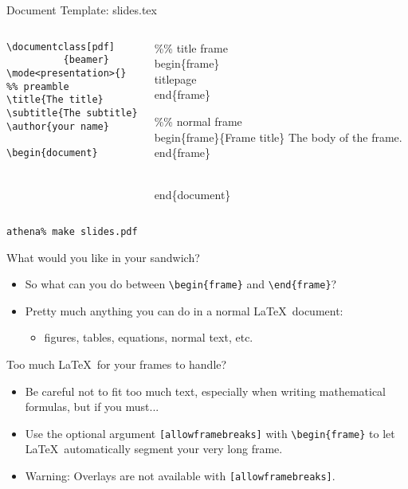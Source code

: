 \documentclass{beamer}
\begin{document}
\begin{frame}[fragile]{Document Template: slides.tex}
\begin{columns}[t]
  \begin{block}{}
    \begin{verbatim}
\documentclass[pdf]
          {beamer}
\mode<presentation>{}
%% preamble
\title{The title}
\subtitle{The subtitle}
\author{your name}

\begin{document}
  	\end{verbatim}	
  \end{block}
  
	\begin{block}{}
		\begin{semiverbatim}
\%\% title frame
\\begin\{frame\}
    \\titlepage
\\end\{frame\}

\%\% normal frame
\\begin\{frame\}\{Frame title\}
    The body of the frame.
\\end\{frame\}

\\end\{document\}
		\end{semiverbatim}
	\end{block}
\end{columns}
\verb+athena% make slides.pdf+
\end{frame}

\begin{frame}[fragile]{What would you like in your sandwich?}
\begin{itemize}
	\item So what can you do between \verb=\begin{frame}= and \verb=\end{frame}=?
	\pause
	\item Pretty much anything you can do in a normal \LaTeX\
	document:
	\pause
	\begin{itemize}
		\item figures, tables, equations, normal text, etc.
	\end{itemize}
\end{itemize}
\end{frame}

\begin{frame}[fragile]{Too much \LaTeX\ for your frames to handle?}
	\begin{itemize}
		\item Be careful not to fit too much text, especially when writing mathematical formulas, but if you must...
		\pause
		\item Use the optional argument \verb=[allowframebreaks]= with \verb=\begin{frame}= to let \LaTeX\ automatically segment your very long frame.
		\pause
		\item Warning: Overlays are not available with \verb=[allowframebreaks]=.
	\end{itemize}
\end{frame}
\end{document}
